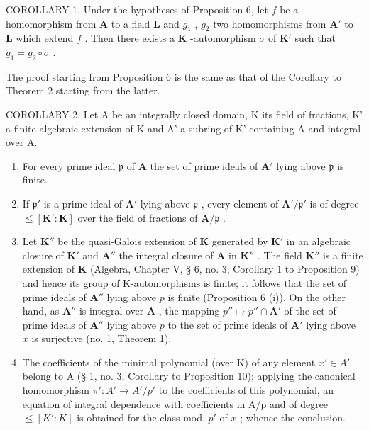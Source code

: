 COROLLARY 1. Under the hypotheses of Proposition 6, let \(f\) be a homomorphism from \(\mathbf{A}\) to a field \(\mathbf{L}\) and \(g_1\) , \(g_2\) two homomorphisms from \(\mathbf{A}'\) to \(\mathbf{L}\) which extend \(f\) . Then there exists a \(\mathbf{K}\) -automorphism \(\sigma\) of \(\mathbf{K}'\) such that \(g_1 = g_2 \circ \sigma\) .

The proof starting from Proposition 6 is the same as that of the Corollary to Theorem 2 starting from the latter.

COROLLARY 2. Let A be an integrally closed domain, K its field of fractions, K' a finite algebraic extension of K and A' a subring of K' containing A and integral over A.

\begin{enumerate}
\def\labelenumi{(\roman{enumi})}
\item
  For every prime ideal \(\mathfrak{p}\) of \(\mathbf{A}\) the set of prime ideals of \(\mathbf{A}'\) lying above \(\mathfrak{p}\) is finite.\\
\item
  If \(\mathfrak{p}'\) is a prime ideal of \(\mathbf{A}'\) lying above \(\mathfrak{p}\) , every element of \(\mathbf{A}' / \mathfrak{p}'\) is of degree \(\leqslant [\mathbf{K}' : \mathbf{K}]\) over the field of fractions of \(\mathbf{A} / \mathfrak{p}\) .
\item
  Let \(\mathbf{K}''\) be the quasi-Galois extension of \(\mathbf{K}\) generated by \(\mathbf{K}'\) in an algebraic closure of \(\mathbf{K}'\) and \(\mathbf{A}''\) the integral closure of \(\mathbf{A}\) in \(\mathbf{K}''\) . The field \(\mathbf{K}''\) is a finite extension of \(\mathbf{K}\) (Algebra, Chapter V, § 6, no. 3, Corollary 1 to Proposition 9) and hence its group of K-automorphisms is finite; it follows that the set of prime ideals of \(\mathbf{A}''\) lying above \(p\) is finite (Proposition 6 (i)). On the other hand, as \(\mathbf{A}''\) is integral over \(\mathbf{A}\) , the mapping \(p'' \mapsto p'' \cap \mathbf{A}'\) of the set of prime ideals of \(\mathbf{A}''\) lying above \(p\) to the set of prime ideals of \(\mathbf{A}'\) lying above \(x\) is surjective (no. 1, Theorem 1).
\item
  The coefficients of the minimal polynomial (over K) of any element \(x' \in A'\) belong to A (§ 1, no. 3, Corollary to Proposition 10); applying the canonical homomorphism \(\pi': A' \to A'/p'\) to the coefficients of this polynomial, an equation of integral dependence with coefficients in A/p and of degree \(\leqslant [K': K]\) is obtained for the class mod. \(p'\) of \(x\) ; whence the conclusion.
\end{enumerate}

